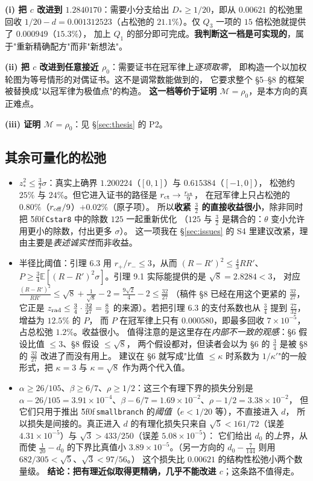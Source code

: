 \documentclass[UTF8,11pt]{ctexart}
\theoremstyle{definition}
\newcommand{\E}{\mathbb{E}}
\newcommand{\peq}[1]{\textup{\u5f0f}\,\texttt{#1}}
\begin{document}
\textbf{(i) 把 $c$ 改进到 $1.2840170$}：需要小分支给出 $D_*\ge1/20$，即从 $0.00621$ 的松弛里回收
$1/20-d=0.001312523$（占松弛的 $21.1\%$）。仅 $Q_3$ 一项的 $15$ 倍松弛就提供了 $0.000949$（$15.3\%$），
加上 $Q_1$ 的部分即可完成。\textbf{我判断这一档是可实现的}，属于"重新精确配方"而非"新想法"。

\textbf{(ii) 把 $c$ 改进到任意接近 $\rho_0$}：需要证书在冠军律上\emph{逐项取零}，
即构造一个以加权轮图为等号情形的对偶证书。这不是调常数能做到的，
它要求整个 \S5--\S8 的框架被替换成"以冠军律为极值点"的构造。
\textbf{这一档等价于证明 $\mathcal M=\rho_0$}，是本方向的真正难点。

\textbf{(iii) 证明 $\mathcal M=\rho_0$}：见 \S\ref{sec:thesis} 的 P2。

\subsection{其余可量化的松弛}

\begin{itemize}[leftmargin=1.6em,itemsep=2pt]
\item $z_*^2\le\frac32\sigma$：真实上确界 $1.200224$（$[0,1]$）与 $0.615384$（$[-1,0]$），
松弛约 $25\%$ 与 $24\%$。但它进入证书的路径是 $r_{\rm ct}\to\frac{r_{\rm ct}}9$，
在冠军律上只占松弛的 $0.80\%$（$r_{\rm off}/9$）$+0.02\%$（原子项）。
所以\textbf{收紧 $\frac32$ 的直接收益很小}，除非同时把 \peq{Cstar8} 中的除数 $125$ 一起重新优化
（$125$ 与 $\frac32$ 是耦合的：$\theta$ 变小允许用更小的除数，付出更多 $\sigma$）。
这一项我在 \S\ref{sec:issues} 的 S4 里建议改紧，理由主要是\emph{表述诚实性}而非收益。
\item 半径比阈值：引理 6.3 用 $r_+/r_-\le3$，从而 $(R-R')^2\le\frac43RR'$、
$P\ge\frac34\E[(R-R')^2\sigma]$。引理 9.1 实际能提供的是 $\sqrt8=2.8284<3$，
对应 $\frac{(R-R')^2}{RR'}\le\sqrt8+\frac1{\sqrt8}-2=\frac{9\sqrt2}4-2\le\frac{32}{27}$
（稿件 \S8 已经在用这个更紧的 $\frac{32}{27}$，它正是 $z_{\rm rad}\le\frac34\cdot\frac{32}{27}=\frac89$
的来源）。若把引理 6.3 的支付系数也从 $\frac34$ 提到 $\frac{27}{32}$，增益为 $12.5\%$ 的 $P$，
而 $P$ 在冠军律上只有 $0.000580$，即最多回收 $7\times10^{-5}$，占总松弛 $1.2\%$。收益很小。
值得注意的是这里存在\emph{内部不一致的观感}：\S6 假设比值 $\le3$、\S8 假设 $\le\sqrt8$，
两个假设都对，但读者会以为 \S6 的 $\frac34$ 是被 \S8 的 $\frac{32}{27}$ 改进了而没有用上。
建议在 \S6 就写成"比值 $\le\kappa$ 时系数为 $1/\kappa'$"的一般形式，把 $\kappa=3$ 与
$\kappa=\sqrt8$ 作为两个代入值。
\item $\alpha\ge26/105$、$\beta\ge6/7$、$\rho\ge1/2$：这三个有理下界的损失分别是
$\alpha-26/105=3.91\times10^{-4}$、$\beta-6/7=1.69\times10^{-2}$、$\rho-1/2=3.38\times10^{-2}$，
但它们只用于推出 \peq{smallbranch} 的\emph{阈值}（$e<1/20$ 等），不直接进入 $d$，
所以损失是间接的。真正进入 $d$ 的有理化损失只来自
$\sqrt5<161/72$（误差 $4.31\times10^{-5}$）与 $\sqrt3>433/250$（误差 $5.08\times10^{-5}$）：
它们给出 $d_0$ 的\emph{上}界，从而使 $\frac1{20}-d_0$ 的下界比真值小
$3.89\times10^{-5}$。（另一方向的 $d_0-\frac7{144}$ 则用 $682/305<\sqrt5$、$\sqrt3<97/56$。）
这个损失比 $0.00621$ 的结构性松弛小两个数量级。
\textbf{结论：把有理近似取得更精确，几乎不能改进 $c$}；这条路不值得走。
\end{itemize}
\end{document}
